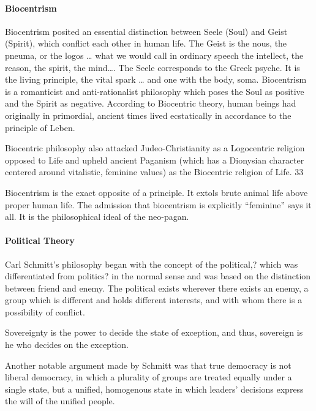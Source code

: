 \paragraph{Biocentrism}
\begin{quotex}
Biocentrism posited an essential distinction between Seele (Soul) and Geist (Spirit), which conflict each other in human
life. The Geist is the nous, the pneuma, or the logos … what we would call in ordinary speech the intellect, the
reason, the spirit, the mind…. The Seele corresponds to the Greek psyche. It is the living principle, the vital spark …
and one with the body, soma. Biocentrism is a romanticist and anti-rationalist philosophy which poses the Soul as
positive and the Spirit as negative. According to Biocentric theory, human beings had originally in primordial, ancient
times lived ecstatically in accordance to the principle of Leben. 

Biocentric philosophy also attacked Judeo-Christianity as a Logocentric religion opposed to Life and upheld ancient
Paganism (which has a Dionysian character centered around vitalistic, feminine values) as the Biocentric religion of
Life. 33 

\end{quotex}
Biocentrism is the exact opposite of a principle. It extols brute animal life above proper human life. The admission
that biocentrism is explicitly “feminine” says it all. It is the philosophical ideal of the neo-pagan.

\paragraph{Political Theory}
\begin{quotex}
Carl Schmitt's philosophy began with the concept of the political,? which was differentiated from politics?
in the normal sense and was based on the distinction between friend and enemy. The political exists wherever there
exists an enemy, a group which is different and holds different interests, and with whom there is a possibility of
conflict. 

Sovereignty is the power to decide the state of exception, and thus, sovereign is he who decides on the exception. 

\end{quotex}
Another notable argument made by Schmitt was that true democracy is not liberal democracy, in which a plurality of
groups are treated equally under a single state, but a unified, homogenous state in which leaders' decisions express the will of the unified people.

